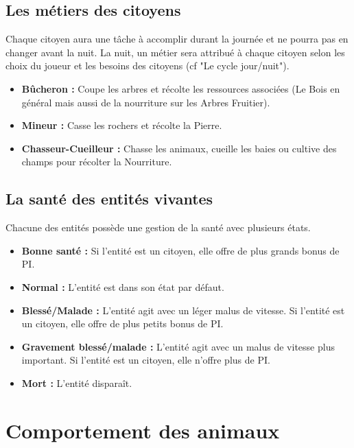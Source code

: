 \documentclass[a4paper]{article}
\begin{document}
      \subsection{Les métiers des citoyens}
        Chaque citoyen aura une tâche à accomplir durant la journée et ne pourra pas en changer avant la nuit. La nuit, un métier sera attribué à chaque citoyen selon les choix du joueur et les besoins des citoyens (cf "Le cycle jour/nuit").
        \begin{itemize}
          \item \textbf{Bûcheron :} \small{ Coupe les arbres et récolte les ressources associées (Le Bois en général mais aussi de la nourriture sur les Arbres Fruitier).}
          \item \textbf{Mineur :} \small{ Casse les rochers et récolte la Pierre.}
          \item \textbf{Chasseur-Cueilleur :} \small{ Chasse les animaux, cueille les baies ou cultive des champs pour récolter la Nourriture.}
        \end{itemize}

      \subsection{La santé des entités vivantes}
        Chacune des entités possède une gestion de la santé avec plusieurs états.
        \begin{itemize}
          \item \textbf{Bonne santé :} \small{ Si l'entité est un citoyen, elle offre de plus grands bonus de PI.}
          \item \textbf{Normal :} \small{ L'entité est dans son état par défaut.}
          \item \textbf{Blessé/Malade :} \small{ L'entité agit avec un léger malus de vitesse. Si l'entité est un citoyen, elle offre de plus petits bonus de PI.}
          \item \textbf{Gravement blessé/malade :} \small{ L'entité agit avec un malus de vitesse plus important. Si l'entité est un citoyen, elle n'offre plus de PI.}
          \item \textbf{Mort :} \small{ L'entité disparaît.}
        \end{itemize}


    \section{Comportement des animaux}
\end{document}
